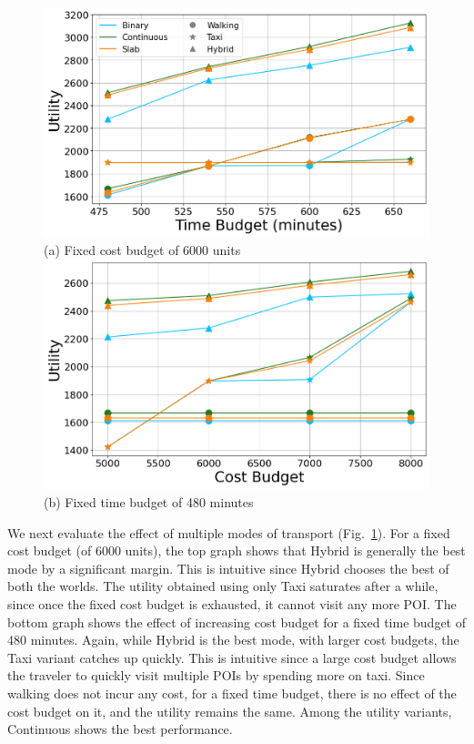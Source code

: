 \begin{figure}[t]
\centering
\includegraphics[width=\figwidth]{plots/multimodality1.png} \\
(a) Fixed cost budget of 6000 units 
\includegraphics[width=\figwidth]{plots/multimodality2.png} \\
(b) Fixed time budget of 480 minutes
\label{fig:multi-modal}
\end{figure}

We next evaluate the effect of multiple modes of transport (Fig.~\ref{fig:multi-modal}).
For a fixed cost budget (of 6000 units), the top graph shows that Hybrid is generally the best mode by a significant margin. This is intuitive since Hybrid chooses the best of both the worlds.
The utility obtained using only Taxi saturates after a while, since once the fixed cost budget is exhausted, it cannot visit any more POI.
The bottom graph shows the effect of increasing cost budget for a fixed time budget of 480 minutes.
Again, while Hybrid is the best mode, with larger cost budgets, the Taxi variant catches up quickly.
This is intuitive since a large cost budget allows the traveler to quickly visit multiple POIs by spending more on taxi.
Since walking does not incur any cost, for a fixed time budget, there is no effect of the cost budget on it, and the utility remains the same.
Among the utility variants, Continuous shows the best performance.

